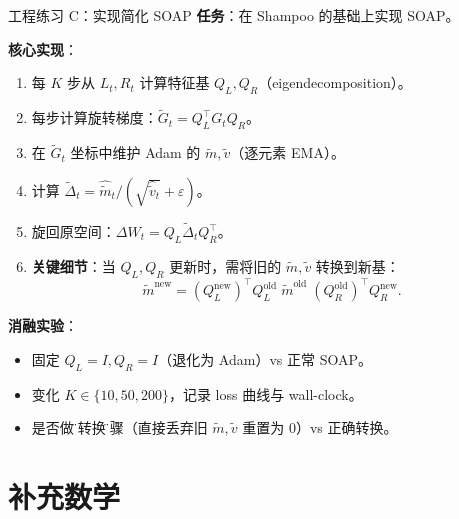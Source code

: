 \documentclass[aspectratio=169,10pt]{ctexbeamer}
\newcommand{\eps}{\varepsilon}
\begin{document}
\begin{frame}{工程练习 C：实现简化 SOAP}
\textbf{任务}：在 Shampoo 的基础上实现 SOAP。

\vspace{.2cm}
\textbf{核心实现}：
\begin{enumerate}
  \item 每 $K$ 步从 $L_t,R_t$ 计算特征基 $Q_L,Q_R$（eigendecomposition）。
  \item 每步计算旋转梯度：$\tilde G_t=Q_L^\top G_t Q_R$。
  \item 在 $\tilde G_t$ 坐标中维护 Adam 的 $\tilde m,\tilde v$（逐元素 EMA）。
  \item 计算 $\tilde\Delta_t=\hat{\tilde m}_t/(\sqrt{\hat{\tilde v}_t}+\eps)$。
  \item 旋回原空间：$\Delta W_t=Q_L\tilde\Delta_t Q_R^\top$。
  \item \textbf{关键细节}：当 $Q_L,Q_R$ 更新时，需将旧的 $\tilde m,\tilde v$ 转换到新基：
  \[
    \tilde m^{\text{new}}=(Q_L^{\text{new}})^\top Q_L^{\text{old}}\;\tilde m^{\text{old}}\;(Q_R^{\text{old}})^\top Q_R^{\text{new}}.
  \]
\end{enumerate}

\vspace{.2cm}
\textbf{消融实验}：
\begin{itemize}
  \item 固定 $Q_L=I,Q_R=I$（退化为 Adam）vs 正常 SOAP。
  \item 变化 $K\in\{10,50,200\}$，记录 loss 曲线与 wall-clock。
  \item 是否做\"基转换\"步骤（直接丢弃旧 $\tilde m,\tilde v$ 重置为 0）vs 正确转换。
\end{itemize}
\end{frame}

\section{补充数学}
\end{document}
